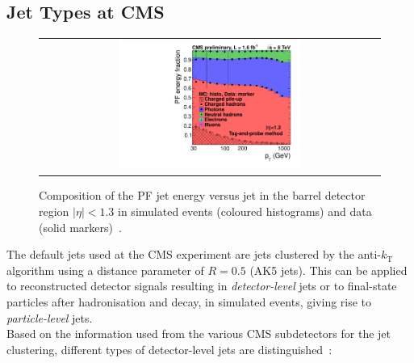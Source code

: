 \subsection{Jet Types at CMS}
\begin{figure}[!tp]
  \centering 
  \begin{tabular}{c}
    \includegraphics[width=0.55\textwidth]{figures/calcFrac_Frac0_MC-1.pdf} 
  \end{tabular}
  \caption{Composition of the PF jet energy versus jet \pt in the barrel detector region $|\eta| < 1.3$ in simulated events (coloured histograms) and data (solid markers)~\cite{CMS-DP-2012-012}.}
  \label{fig:jets_pf_comp}
\end{figure}
\label{subsec:jets_types}
The default jets used at the CMS experiment are jets clustered by the anti-$k_\mathrm{T}$ algorithm using a distance parameter of $R = 0.5$ (AK5 jets). This can be applied to reconstructed detector signals resulting in \textit{detector-level} jets or to final-state particles after hadronisation and decay, in simulated events, giving rise to \textit{particle-level} jets.  \\
Based on the information used from the various CMS subdetectors for the jet clustering, different types of detector-level jets are distinguished~\cite{1748-0221-6-11-P11002}:
